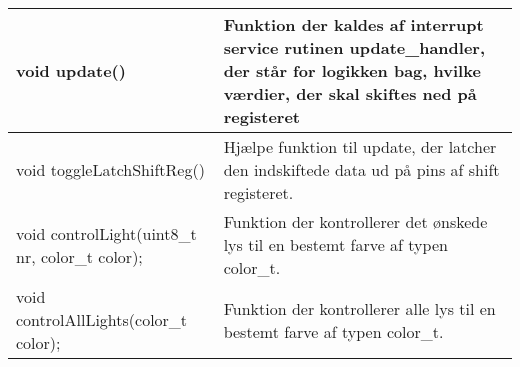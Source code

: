 \documentclass[Softwaredesign/Softwaredesign_main.tex]{subfiles}
\begin{document}
\begin{longtable}{|L{0.45\textwidth}|L{0.45\textwidth}|}
void update()                                   & Funktion der kaldes af interrupt service rutinen update\_handler, der står for logikken bag, hvilke værdier, der skal skiftes ned på registeret\\ \hline
void toggleLatchShiftReg()                      & Hjælpe funktion til update, der latcher den indskiftede data ud på pins af shift registeret.\\ \hline
void controlLight(uint8\_t nr, color\_t color); & Funktion der kontrollerer det ønskede lys til en bestemt farve af typen color\_t.\\ \hline
void controlAllLights(color\_t color);          & Funktion der kontrollerer alle lys til en bestemt farve af typen color\_t.\\ \hline
\end{longtable}
\end{document}
